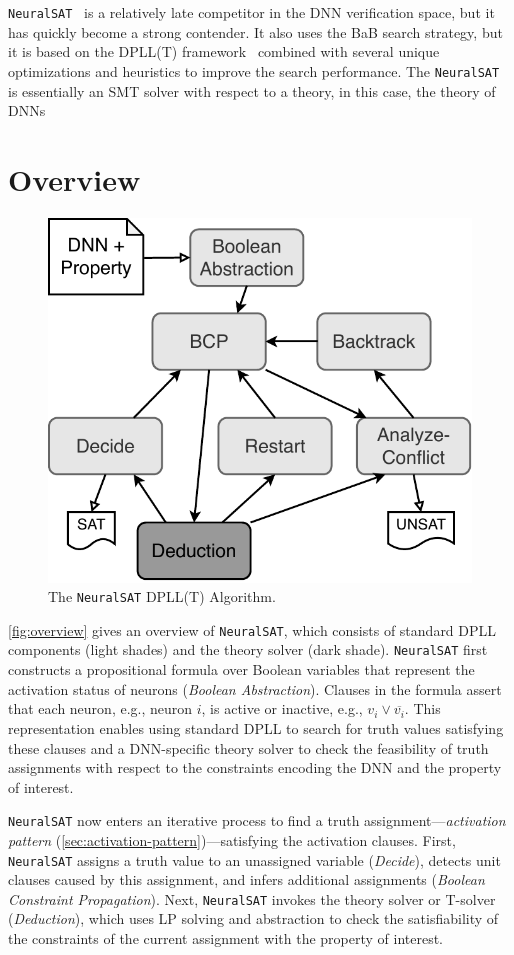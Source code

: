 \documentclass[oneside,11pt,dvipsnames]{book}
\numberwithin{equation}{section}
\theoremstyle{definition}
\theoremstyle{remark}
\newcommand{\neuralsat}{\texttt{NeuralSAT}}
\begin{document}
\neuralsat{}~\cite{duong2025neuralsat,duong2024harnessing} is a relatively late competitor in the DNN verification space, but it has quickly become a strong contender. It also uses the BaB search strategy, but it is based on the DPLL(T) framework~\cite{davis1962machine} combined with several unique optimizations and heuristics to improve the search performance.
The \neuralsat{} is essentially an SMT solver with respect to a theory, in this case, the theory of DNNs

\section{Overview}\label{sec:neuralsat:overview}
\begin{figure}[h]
    \centering
    \includegraphics[width=0.4\linewidth]{figure/arch.pdf}
    \caption{\label{fig:overview} The \neuralsat{} DPLL(T) Algorithm.} 
\end{figure}


\autoref{fig:overview} gives an overview of \neuralsat{}, which consists of standard DPLL components (light shades) and the theory solver (dark shade).
\neuralsat{} first constructs a propositional formula over Boolean variables that represent the activation status of neurons (\emph{Boolean Abstraction}). Clauses in the formula assert that each neuron, e.g., neuron $i$, is active or inactive, e.g., $v_i \vee \overline{v_i}$.
This representation enables using standard DPLL to search for truth values satisfying these clauses and a DNN-specific theory solver to check the feasibility of truth assignments with respect to the constraints encoding the DNN and the property of interest.

\neuralsat{} now enters an iterative process to find a truth assignment---\emph{activation pattern} (\autoref{sec:activation-pattern})---satisfying the activation clauses.
First, \neuralsat{} assigns a truth value to an unassigned variable (\emph{Decide}), detects unit clauses caused by this assignment, and infers additional assignments (\emph{Boolean Constraint Propagation}).
Next, \neuralsat{} invokes the theory solver or T-solver (\emph{Deduction}), which uses LP solving and abstraction to check the satisfiability of the constraints of the current assignment with the property of interest. %
\end{document}
